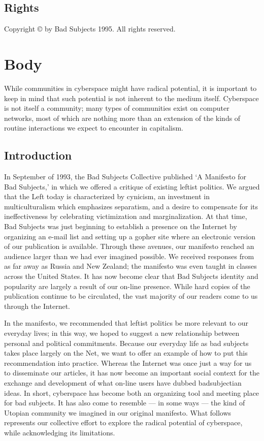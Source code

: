 \documentclass[letterpaper,12pt,english]{sphinxmanual}
\begin{document}
\subsection{Rights}
\label{1995:rights}
Copyright © by Bad Subjects 1995. All rights reserved.


\section{Body}
\label{1995:body}
While communities in cyberspace might have radical potential, it is important to keep in mind that such potential is not inherent to the medium itself. Cyberspace is not itself a community; many types of communities exist on computer networks, most of which are nothing more than an extension of the kinds of routine interactions we expect to encounter in capitalism.


\subsection{Introduction}
\label{1995:introduction}
In September of 1993, the Bad Subjects Collective published `A Manifesto for Bad Subjects,' in which we offered a critique of existing leftist politics. We argued that the Left today is characterized by cynicism, an investment in multiculturalism which emphasizes separatism, and a desire to compensate for its ineffectiveness by celebrating victimization and marginalization. At that time, Bad Subjects was just beginning to establish a presence on the Internet by organizing an e-mail list and setting up a gopher site where an electronic version of our publication is available. Through these avenues, our manifesto reached an audience larger than we had ever imagined possible. We received responses from as far away as Russia and New Zealand; the manifesto was even taught in classes across the United States. It has now become clear that Bad Subjects identity and popularity are largely a result of our on-line presence. While hard copies of the publication continue to be circulated, the vast majority of our readers come to us through the Internet.

In the manifesto, we recommended that leftist politics be more relevant to our everyday lives; in this way, we hoped to suggest a new relationship between personal and political commitments. Because our everyday life as bad subjects takes place largely on the Net, we want to offer an example of how to put this recommendation into practice. Whereas the Internet was once just a way for us to disseminate our articles, it has now become an important social context for the exchange and development of what on-line users have dubbed badsubjectian ideas. In short, cyberspace has become both an organizing tool and meeting place for bad subjects. It has also come to resemble — in some ways — the kind of Utopian community we imagined in our original manifesto. What follows represents our collective effort to explore the radical potential of cyberspace, while acknowledging its limitations.
\end{document}
